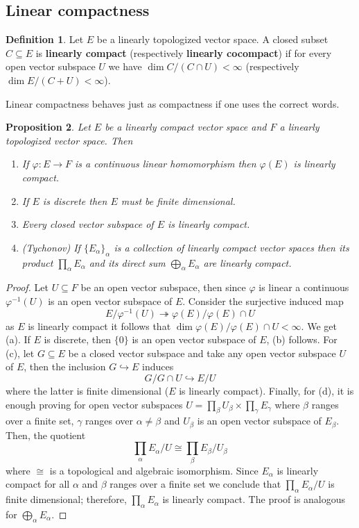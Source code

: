 \documentclass{book}[12pt]
\theoremstyle{definition}
\newtheorem{definition}{Definition}[chapter]
\theoremstyle{plain}
\newtheorem{proposition}[definition]{Proposition}
\theoremstyle{remark}
\begin{document}
	\subsection*{Linear compactness}
	\begin{definition}\label{linear_compactness}
		Let $E$ be a linearly topologized vector space. A closed subset $C \subseteq E$ is \textbf{linearly compact} (respectively \textbf{linearly cocompact}) if for every open vector subspace $U$ we have $\dim C/(C \cap U) < \infty$ (respectively $\dim E/(C+U) < \infty$). 
	\end{definition}
	Linear compactness behaves just as compactness if one uses the correct words.
	\begin{proposition}\label{linear_compactness_properties}
	 	Let $E$ be a linearly compact vector space and $F$ a linearly topologized vector space. Then
	 	\begin{enumerate}[label = (\alph*)]
	 		\item If $\varphi\colon E \to F$ is a continuous linear homomorphism then $\varphi(E)$ is linearly compact.
	 		\item If $E$ is discrete then $E$ must be finite dimensional.
	 		\item Every closed vector subspace of $E$ is linearly compact.
	 		\item (Tychonov) If $\{E_{\alpha}\}_{\alpha}$ is a collection of linearly compact vector spaces then its product $\prod_{\alpha} E_{\alpha}$ and its direct sum $\bigoplus_{\alpha}E_{\alpha}$ are linearly compact.
	 	\end{enumerate}
 	\end{proposition}
 	\begin{proof}
 		Let $U \subseteq F$ be an open vector subspace, then since $\varphi$ is linear a continuous $\varphi^{-1}(U)$ is an open vector subspace of $E$. Consider the surjective induced map 
 		\[
 			E/\varphi^{-1}(U) \twoheadrightarrow \varphi(E)/\varphi(E)\cap U
 		\]
 		as $E$ is linearly compact it follows that $\dim \varphi(E)/\varphi(E)\cap U < \infty$. We get (a). If $E$ is discrete, then $\{0\}$ is an open vector subspace of $E$, (b) follows. For (c), let $G \subseteq E$ be a closed vector subspace and take any open vector subspace $U$ of $E$, then the inclusion $G \hookrightarrow E$ induces
 		\[
 			G/G \cap U \hookrightarrow E/U
 		\]
 		where the latter is finite dimensional ($E$ is linearly compact). Finally, for (d), it is enough proving for open vector subspaces $U = \prod_{\beta} U_{\beta} \times \prod_{\gamma} E_{\gamma}$ where $\beta$ ranges over a finite set, $\gamma$ ranges over $\alpha \neq \beta$ and $U_{\beta}$ is an open vector subspace of $E_{\beta}$. Then, the quotient
 		\[
 			\prod_{\alpha}E_{\alpha} / U \cong \prod_{\beta} E_{\beta}/U_{\beta}
 		\]
 		where $\cong$ is a topological and algebraic isomorphism. Since $E_{\alpha}$ is linearly compact for all $\alpha$ and $\beta$ ranges over a finite set we conclude that $\prod_{\alpha} E_{\alpha} / U$ is finite dimensional; therefore, $\prod_{\alpha} E_{\alpha}$ is linearly compact. The proof is analogous for $\bigoplus_{\alpha} E_{\alpha}$.
 	\end{proof}
\end{document}
